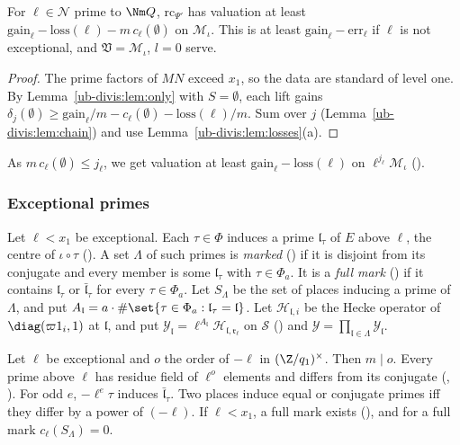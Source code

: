 \begin{proposition}
\label{ub-divis:prop:nonexc}
For $\ell\in\mathcal N$ prime to $\Nm Q$, $\mathrm{rc}_{\Psi'}$ has
valuation at least $\mathrm{gain}_\ell-\mathrm{loss}(\ell)-m\,c_\ell(\emptyset)$ on $\mathcal M_\iota$.
This is at least $\mathrm{gain}_\ell-\mathrm{err}_\ell$ if $\ell$ is not exceptional, and $\mathfrak V=\mathcal
M_\iota$, $l=0$ serve.
\end{proposition}

\begin{proof}
The prime factors of $MN$ exceed $x_1$, so the data are standard of level one. By
Lemma~\ref{ub-divis:lem:only} with $S=\emptyset$, each lift gains
$\delta_j(\emptyset)\ge\mathrm{gain}_\ell/m-c_\ell(\emptyset)-\mathrm{loss}(\ell)/m$. Sum over $j$
(Lemma~\ref{ub-divis:lem:chain}) and use Lemma~\ref{ub-divis:lem:losses}(a).
\end{proof}

As $m\,c_\ell(\emptyset)\le j_\ell$, we get valuation at least $\mathrm{gain}_\ell-\mathrm{loss}(\ell)$ on
$\ell^{j_\ell}\mathcal M_\iota$ ().

\subsubsection{Exceptional primes}
Let $\ell<x_1$ be exceptional. Each $\tau\in\Phi$ induces a prime $\mathfrak l_\tau$ of $E$ above
$\ell$, the centre of $\iota\circ\tau$ (). A set $\Lambda$ of such primes
is \emph{marked} () if it is disjoint from its conjugate and every member is
some $\mathfrak l_\tau$ with $\tau\in\Phi_a$. It is a \emph{full mark} () if
it contains $\mathfrak l_\tau$ or $\bar{\mathfrak l}_\tau$ for every $\tau\in\Phi_a$. Let
$S_\Lambda$ be the set of places inducing a prime of $\Lambda$, and put $A_{\mathfrak
l}=a\cdot\#\set{\tau\in\Phi_a:\mathfrak l_\tau=\mathfrak l}$. Let $\mathcal H_{\mathfrak l,i}$ be the Hecke
operator of $\diag(\varpi1_i,1)$ at $\mathfrak l$, and put $\mathcal Y_{\mathfrak l}=\ell^{A_{\mathfrak
l}}\mathcal H_{\mathfrak l,\mathfrak r_\ell}$ on $\mathcal S$ () and
$\mathcal Y=\prod_{\mathfrak l\in\Lambda}\mathcal Y_{\mathfrak l}$.

\begin{lemma}\label{ub-divis:lem:orbits}
Let $\ell$ be exceptional and $o$ the order of $-\ell$ in $(\Z/q_1)^\times$. Then $m\mid o$. Every prime
above $\ell$ has residue field of $\ell^o$ elements and differs from its conjugate
(, ). For odd
$e$, $-\ell^e\tau$ induces $\bar{\mathfrak l}_\tau$. Two places induce equal or conjugate primes
iff they differ by a power of $(-\ell)$. If $\ell<x_1$, a full mark exists
(), and for a full mark $c_\ell(S_\Lambda)=0$.
\end{lemma}

